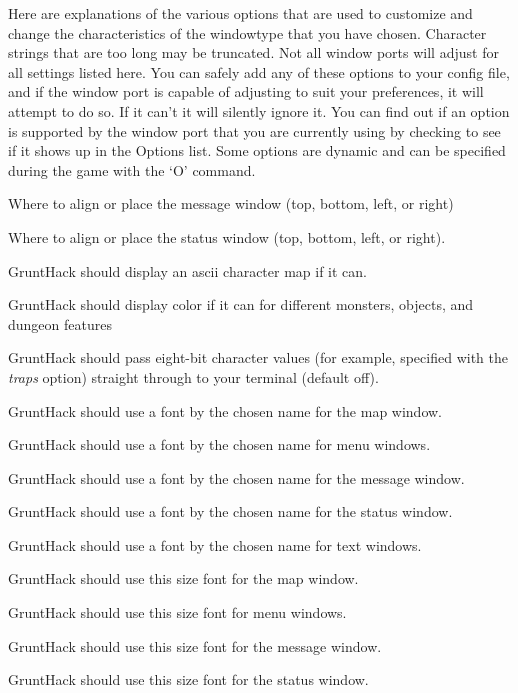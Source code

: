 Here are explanations of the various options that are
used to customize and change the characteristics of the
windowtype that you have chosen.
Character strings that are too long may be truncated.
Not all window ports will adjust for all settings listed
here.  You can safely add any of these options to your config
file, and if the window port is capable of adjusting to
suit your preferences, it will attempt to do so. If it
can't it will silently ignore it.  You can find out if an
option is supported by the window port that you are currently
using by checking to see if it shows up in the Options list.
Some options are dynamic and can be specified during the game
with the `O' command.
\blist{}
\item[\tb{align\_message}]
Where to align or place the message window (top, bottom, left, or right)
\item[\tb{align\_status}]
Where to align or place the status window (top, bottom, left, or right).
\item[\tb{ascii\_map}]
GruntHack should display an ascii character map if it can.
\item[\tb{color		}]
GruntHack should display color if it can for different monsters, 
objects, and dungeon features
\item[\tb{eight\_bit\_tty	}]
GruntHack should pass eight-bit character values (for example, specified with
the
{\it traps }
option) straight through to your terminal (default off).
\item[\tb{font\_map	}]
GruntHack should use a font by the chosen name for the map window.
\item[\tb{font\_menu	}]
GruntHack should use a font by the chosen name for menu windows.
\item[\tb{font\_message	}]
GruntHack should use a font by the chosen name for the message window.
\item[\tb{font\_status	}]
GruntHack should use a font by the chosen name for the status window.
\item[\tb{font\_text	}]
GruntHack should use a font by the chosen name for text windows.
\item[\tb{font\_size\_map	}]
GruntHack should use this size font for the map window.
\item[\tb{font\_size\_menu	}]
GruntHack should use this size font for menu windows.
\item[\tb{font\_size\_message }]
GruntHack should use this size font for the message window.
\item[\tb{font\_size\_status}]
GruntHack should use this size font for the status window.
